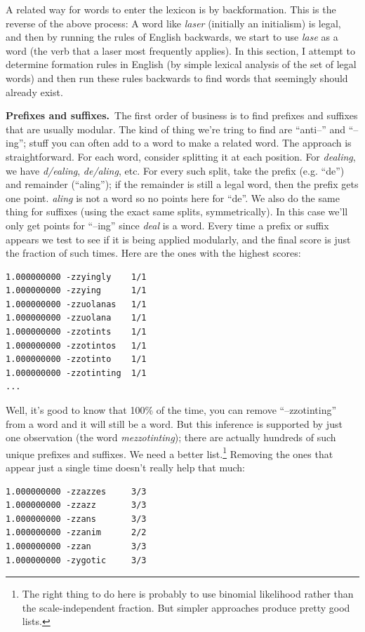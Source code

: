 \documentclass[twocolumn]{article}
\begin{document}
A related way for words to enter the lexicon is by backformation. This
is the reverse of the above process: A word like {\it laser}
(initially an initialism) is legal, and then by running the rules of
English backwards, we start to use {\it lase} as a word (the verb
that a laser most frequently applies). In this section, I attempt
to determine formation rules in English (by simple lexical analysis
of the set of legal words) and then run these rules backwards to find
words that seemingly should already exist.

{\bf Prefixes and suffixes.}\ The first order of business is to find
prefixes and suffixes that are usually modular. The kind of thing
we're tring to find are ``anti--'' and ``--ing''; stuff you can often
add to a word to make a related word. The approach is straightforward.
For each word, consider splitting it at each position. For {\it dealing},
we have {\it d/ealing}, {\it de/aling}, etc. For every such split,
take the prefix (e.g. ``de'') and remainder (``aling''); if the remainder
is still a legal word, then the prefix gets one point. {\it aling} is not
a word so no points here for ``de''. We also do the same thing for suffixes
(using the exact same splits, symmetrically). In this case we'll only get
points for ``--ing'' since {\it deal} is a word. Every time a prefix or
suffix appears we test to see if it is being applied modularly, and
the final score is just the fraction of such times. Here are the ones with
the highest scores:

\begin{verbatim}
1.000000000 -zzyingly    1/1
1.000000000 -zzying      1/1
1.000000000 -zzuolanas   1/1
1.000000000 -zzuolana    1/1
1.000000000 -zzotints    1/1
1.000000000 -zzotintos   1/1
1.000000000 -zzotinto    1/1
1.000000000 -zzotinting  1/1
...
\end{verbatim}

Well, it's good to know that 100\% of the time, you can remove
``--zzotinting'' from a word and it will still be a word. But this
inference is supported by just one observation (the word {\it
  mezzotinting}); there are actually hundreds of such unique prefixes
and suffixes. We need a better list.\!\footnote{The right thing to do
  here is probably to use binomial likelihood rather than the
  scale-independent fraction. But simpler approaches produce pretty
  good lists.} Removing the ones that appear just a single time
doesn't really help that much:

\begin{verbatim}
1.000000000 -zzazzes     3/3
1.000000000 -zzazz       3/3
1.000000000 -zzans       3/3
1.000000000 -zzanim      2/2
1.000000000 -zzan        3/3
1.000000000 -zygotic     3/3
\end{verbatim}
\end{document}
